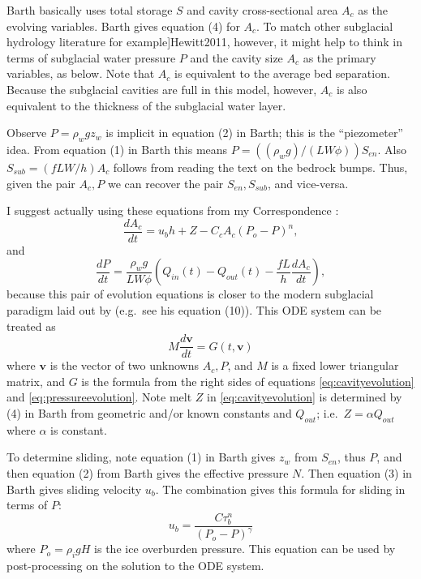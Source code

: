 \documentclass[11pt,final]{amsart}%
\newcommand{\citep}[1]{\cite{#1}}
\newcommand\bv{\mathbf{v}}
\begin{document}
Barth basically uses total storage $S$ and cavity cross-sectional area $A_c$ as the evolving variables.  Barth gives equation (4) for $A_c$.  To match other subglacial hydrology literature \citep[for example]{Hewitt2011}, however, it might help to think in terms of subglacial water pressure $P$ and the cavity size $A_c$ as the primary variables, as below.  Note that $A_c$ is equivalent to the average bed separation.  Because the subglacial cavities are full in this model, however, $A_c$ is also equivalent to the thickness of the subglacial water layer.

Observe $P = \rho_w g z_w$ is implicit in equation (2) in Barth; this is the ``piezometer'' idea.  From equation (1) in Barth this means $P = ((\rho_w g)/(LW\phi)) S_{en}$.  Also $S_{sub} = (fLW/h) A_c$ follows from reading the text on the bedrock bumps.  Thus, given the pair $A_c,P$ we can recover the pair $S_{en},S_{sub}$, and vice-versa.

I suggest actually using these equations from my Correspondence \citep{Bueler2014correspondence}:
\begin{equation}
\frac{dA_c}{dt} = u_b h + Z - C_c A_c (P_o-P)^n,  \label{eq:cavityevolution}
\end{equation}
and
\begin{equation}
\frac{dP}{dt} = \frac{\rho_w g}{L W \phi} \left(Q_{in}(t) - Q_{out}(t) - \frac{f L }{h} \frac{d A_c}{dt}\right), \label{eq:pressureevolution}
\end{equation}
because this pair of evolution equations is closer to the modern subglacial paradigm laid out by \cite{Hewitt2011} (e.g.~see his equation (10)).  This ODE system can be treated as
\begin{equation}
M \frac{d\bv}{dt} = G(t,\bv) \label{eq:system}
\end{equation}
where $\mathbf{v}$ is the vector of two unknowns $A_c,P$, and $M$ is a fixed lower triangular matrix, and $G$ is the formula from the right sides of equations \eqref{eq:cavityevolution} and \eqref{eq:pressureevolution}.  Note melt $Z$ in \eqref{eq:cavityevolution} is determined by (4) in Barth from geometric and/or known constants and $Q_{out}$; i.e.~$Z=\alpha Q_{out}$ where $\alpha$ is constant.

To determine sliding, note equation (1) in Barth gives $z_w$ from $S_{en}$, thus $P$, and then equation (2) from Barth gives the effective pressure $N$.  Then equation (3) in Barth gives sliding velocity $u_b$.  The combination gives this formula for sliding in terms of $P$:
\begin{equation}
u_b = \frac{C \tau_b^n}{(P_o - P)^\gamma} \label{eq:sliding}
\end{equation}
where $P_o=\rho_i g H$ is the ice overburden pressure.  This equation can be used by post-processing on the solution to the ODE system.
\end{document}

